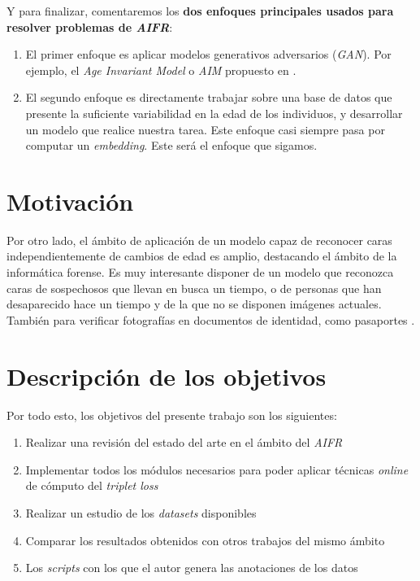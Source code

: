 Y para finalizar, comentaremos los \textbf{dos enfoques principales usados para resolver problemas de \textit{AIFR}}:

\begin{enumerate}
    \item El primer enfoque es aplicar modelos generativos adversarios (\textit{GAN}). Por ejemplo, el \textit{Age Invariant Model} o \textit{AIM} propuesto en \cite{informatica:tecnica_sintesis_aifr}.
    \item El segundo enfoque es directamente trabajar sobre una base de datos que presente la suficiente variabilidad en la edad de los individuos, y desarrollar un modelo que realice nuestra tarea. Este enfoque casi siempre pasa por computar un \textit{embedding}. Este será el enfoque que sigamos.
\end{enumerate}

\section{Motivación}

Por otro lado, el ámbito de aplicación de un modelo capaz de reconocer caras independientemente de cambios de edad es amplio, destacando el ámbito de la informática forense. Es muy interesante disponer de un modelo que reconozca caras de sospechosos que llevan en busca un tiempo, o de personas que han desaparecido hace un tiempo y de la que no se disponen imágenes actuales. También para verificar fotografías en documentos de identidad, como pasaportes \cite{informatica:tecnica_sintesis_aifr}.


\section{Descripción de los objetivos}

Por todo esto, los objetivos del presente trabajo son los siguientes:

\begin{enumerate}
    \item Realizar una revisión del estado del arte en el ámbito del \textit{AIFR}
    \item Implementar todos los módulos necesarios para poder aplicar técnicas \textit{online} de cómputo del \textit{triplet loss}
    \item Realizar un estudio de los \textit{datasets} disponibles
    \item Comparar los resultados obtenidos con otros trabajos del mismo ámbito
    \item Los \textit{scripts} con los que el autor genera las anotaciones de los datos
\end{enumerate}

